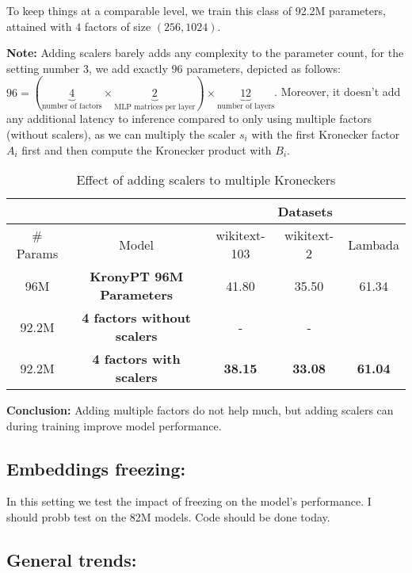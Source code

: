 \documentclass{article}
\begin{document}
{To keep things at a comparable level, we train this class of 92.2M parameters, attained with $4$ factors of size $(256, 1024)$. 


\textbf{Note:} Adding scalers barely adds any complexity to the parameter count, for the setting number 3, we add exactly $96$ parameters, depicted as follows: $96 = (\underbrace{4}_{\text{number of factors}} \times \underbrace{2}_{\text{MLP matrices per layer}}) \times \underbrace{12}_{\text{number of layers}}$. Moreover, it doesn't add any additional latency to inference compared to only using multiple factors (without scalers), as we can multiply the scaler $s_i$ with the first Kronecker factor $A_i$ first and then compute the Kronecker product with $B_i$.

\begin{table}[h]
\centering
\begin{tabular}{|c|c|c|c|c|}
\hline
 & & \multicolumn{3}{c|}{Datasets} \\ \hline
\# Params &  Model            & wikitext-103 & wikitext-2 & Lambada \\ \hline
96M       & \textbf{KronyPT 96M Parameters}  & 41.80        & 35.50      & 61.34         \\ \hline
92.2M     & \textbf{4 factors without scalers} & -            & -          &       \\ \hline
92.2M     & \textbf{4 factors with scalers}  &  \textbf{38.15}   & \textbf{33.08}      & \textbf{61.04} \\ \hline
\end{tabular}
\caption{Effect of adding scalers to multiple Kroneckers}

\end{table}

\textbf{Conclusion:} Adding multiple factors do not help much, but adding scalers can during training improve model performance.

\subsection{Embeddings freezing:}%
\label{sub:Embeddings freezing:}

In this setting we test the impact of freezing on the model's performance. I should probb test on the 82M models. Code should be done today.

\subsection{General trends:}%

}
\end{document}

